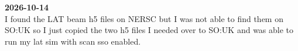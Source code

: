 {\bf 2026-10-14}\\

I found the LAT beam h5 files on NERSC but I was not able to find them on SO:UK so I just copied the two h5 files I needed over to SO:UK and was able to run my lat sim with scan sso enabled. 